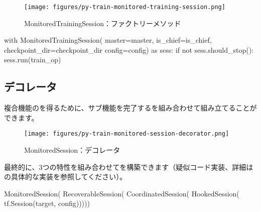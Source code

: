\begin{content}
\begin{figure}[!htbp]
\centering
\texttt{[image: figures/py-train-monitored-training-session.png]}
\caption{MonitoredTrainingSession：ファクトリーメソッド}
 \label{fig:py-train-monitored-training-session}
\end{figure}

\begin{leftbar}
\begin{python}
with MonitoredTrainingSession(
  master=master,
  is_chief=is_chief,
  checkpoint_dir=checkpoint_dir
  config=config) as sess:
  if not sess.should_stop():
    sess.run(train_op)
\end{python}
\end{leftbar}

\subsection{デコレータ}

複合機能のを得るために、サブ機能を完了するを組み合わせて組み立てることができます。

\begin{enum}
\end{enum}

\begin{figure}[!htbp]
\centering
\texttt{[image: figures/py-train-monitored-session-decorator.png]}
\caption{MonitoredSession：デコレータ}
 \label{fig:py-train-monitored-session-decorator}
\end{figure}

最終的に、3つの特性を組み合わせてを構築できます（疑似コード実装、詳細はの具体的な実装を参照してください）。

\begin{leftbar}
\begin{python}
MonitoredSession(
  RecoverableSession(
    CoordinatedSession(
      HookedSession(
        tf.Session(target, config)))))
\end{python}
\end{leftbar}

\end{content}

